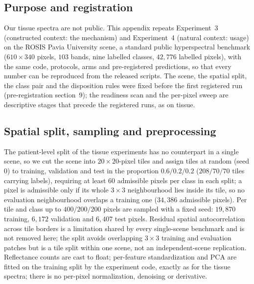 
\subsection{Purpose and registration}
Our tissue spectra are not public. This appendix repeats Experiment~3 (constructed
context: the mechanism) and Experiment~4 (natural context: usage) on the ROSIS Pavia
University scene, a standard public hyperspectral benchmark ($610\times340$ pixels,
$103$ bands, nine labelled classes, $42{,}776$ labelled pixels), with the same code,
protocols, arms and pre-registered predictions, so that every number can be reproduced
from the released scripts. The scene, the spatial split, the class pair and the
disposition rules were fixed before the first registered run (pre-registration
section~9); the readiness scan and the per-pixel sweep are descriptive stages that
precede the registered runs, as on tissue.

\subsection{Spatial split, sampling and preprocessing}
The patient-level split of the tissue experiments has no counterpart in a single scene,
so we cut the scene into $20\times20$-pixel tiles and assign tiles at random (seed $0$)
to training, validation and test in the proportion $0.6/0.2/0.2$ ($208/70/70$ tiles
carrying labels), requiring at least $60$ admissible pixels per class in each split; a
pixel is admissible only if its whole $3\times3$ neighbourhood lies inside its tile, so
no evaluation neighbourhood overlaps a training one ($34{,}386$ admissible pixels). Per
tile and class up to $400/200/200$ pixels are sampled with a fixed seed: $19{,}870$
training, $6{,}172$ validation and $6{,}407$ test pixels. Residual spatial
autocorrelation across tile borders is a limitation shared by every single-scene
benchmark and is not removed here; the split avoids overlapping $3\times3$ training and
evaluation patches but is a tile split within one scene, not an independent-scene
replication. Reflectance counts are cast to float; per-feature
standardization and PCA are fitted on the training split by the experiment code,
exactly as for the tissue spectra; there is no per-pixel normalization, denoising or
derivative.

